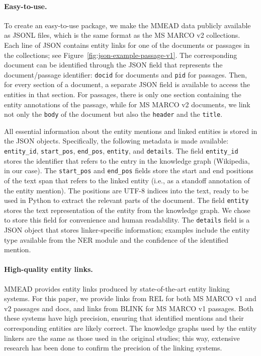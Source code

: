 \paragraph{Easy-to-use.} To create an easy-to-use package, we make the MMEAD data publicly available as JSONL files, which is the same format as the MS MARCO v2 collections. Each line of JSON contains entity links for one of the documents or passages in the collections; see Figure~\ref{fig:json-example-passage-v1}. The corresponding document can be identified through the JSON field that represents the document/passage identifier: \texttt{docid} for documents and \texttt{pid} for passages. Then, for every section of a document, a separate JSON field is available to access the entities in that section. For passages, there is only one section containing the entity annotations of the passage, while for MS MARCO v2 documents, we link not only the \texttt{body} of the document but also the \texttt{header} and the \texttt{title}.

All essential information about the entity mentions and linked entities is stored in the JSON objects. 
Specifically, the following metadata is made available: \texttt{entity\_id}, \texttt{start\_pos}, \texttt{end\_pos}, \texttt{entity}, and \texttt{details}. The field \texttt{entity\_id} stores the identifier that refers to the entry in the knowledge graph (Wikipedia, in our case). The \texttt{start\_pos} and \texttt{end\_pos} fields store the start and end positions of the text span that refers to the linked entity (i.e., as a standoff annotation of the entity mention). The positions are UTF-8 indices into the text, ready to be used in Python to extract the relevant parts of the document. The field \texttt{entity} stores the text representation of the entity from the knowledge graph. 
We chose to store this field for convenience and human readability. The \texttt{details} field is a JSON object that stores linker-specific information; examples include the entity type available from the NER module and the confidence of the identified mention.

\paragraph{High-quality entity links.} MMEAD provides entity links produced by state-of-the-art entity linking systems. For this paper, we provide links from REL for both MS MARCO v1 and v2 passages and docs, and links from BLINK for MS MARCO v1 passages. Both these systems have high precision, ensuring that identified mentions and their corresponding entities are likely correct. The knowledge graphs used by the entity linkers are the same as those used in the original studies; this way, extensive research has been done to confirm the precision of the linking systems.

